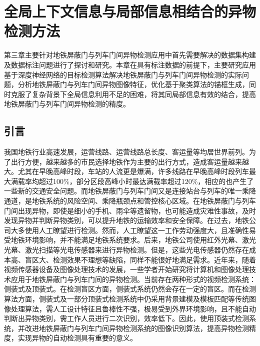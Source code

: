 \chapter{全局上下文信息与局部信息相结合的异物检测方法}
第三章主要针对地铁屏蔽门与列车门间异物检测应用中首先需要解决的数据集构建及数据标注问题进行了探讨和研究。本章在具有标注数据的前提下，主要研究应用基于深度神经网络的目标检测算法解决地铁屏蔽门与列车门间异物检测的实际问题，分析地铁屏蔽门与列车门间异物图像特征，优化基于聚类算法的锚框生成，同时克服了复杂背景下全局信息利用不足的困难，将其同局部信息有效的结合，提高地铁屏蔽门与列车门间异物检测的精度。

\section{引言}
我国地铁行业高速发展，运营线路、运营线路总长度、客运量等均居世界前列。为了出行方便，越来越多的市民选择地铁作为主要的出行方式，造成客运量越来越大。尤其在早晚高峰时段，车站的人流更是爆满，许多线路在早晚高峰时段列车最大满载率均超过100\%，部分区段高峰小时最达满载率超过120\%，相应的也产生了一些新的交通安全问题。而地铁屏蔽门与列车门间又是连接站台与列车的唯一乘降通道，是地铁系统的风险空间、乘降瓶颈点和管控核心区域。在地铁屏蔽门与列车门间出现异物，即使是细小的手机、雨伞等遗留物，也可能造成灾难性事故，及时发现异物并判断异物类别，可以提升地铁的运输效率和安全保障。在过去，地铁公司大多使用人工瞭望进行检测。然而，人工瞭望这一工作劳动强度大，且准确性易受地铁环境影响，并不能满足地铁系统要求。后来，地铁公司使用红外光幕、激光光幕、激光扫描等光电传感器来进行异物检测。但是，这些光电传感器仍然存在成本高、盲区大、检测效果不理想等缺陷，同样不能很好地满足需求。近年来，随着视频传感器设备及图像处理技术的发展，一些学者开始研究将计算机和图像处理技术应用于地铁屏蔽门与列车门间的异物检测。当前存在两种形式的视频检测系统：侧装式及顶装式。在检测盲区方面，侧装式系统仍然会存在一定的盲区。而在检测算法方面，侧装式及一部分顶装式检测系统中仍采用背景建模及模板匹配等传统图像处理算法，需人工设计特征且鲁棒性不强，极易受到外界环境影响，且不能自动判断出异物类别，需工作人员进行二次识别，效率低下。因此，使用顶装式检测系统，并改进地铁屏蔽门与列车门间异物检测系统的图像识别算法，提高异物检测精度，实现异物的自动检测具有重要的意义。

